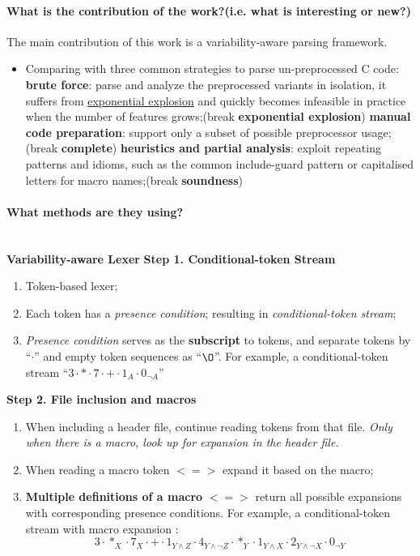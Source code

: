 \documentclass[12pt]{article}
\begin{document}
\paragraph{What is the contribution of the work?(i.e. what is interesting or new?)}
The main contribution of this work is a variability-aware parsing framework. 
\begin{itemize}
	\item  Comparing with three common strategies to parse un-preprocessed C code:
		\subitem \textbf{brute force}: parse and analyze the preprocessed variants in isolation, it suffers from \underline{exponential explosion} and quickly becomes infeasible in practice when the number of features grows;(break \textbf{exponential explosion})
		\subitem \textbf{manual code preparation}: support only a subset of possible preprocessor usage;(break \textbf{complete})
		\subitem \textbf{heuristics and partial analysis}: exploit repeating patterns and idioms, such as the common include-guard pattern or capitalised letters for macro names;(break \textbf{soundness}) 
\end{itemize}

\paragraph{What methods are they using?}\mbox{}\\

\textbf{Variability-aware Lexer}\newline
\textbf{Step 1. Conditional-token Stream}
\begin{enumerate}
	\item Token-based lexer;
	\item Each token has a \textit{presence condition}; resulting in \textit{conditional-token stream};
	\item \textit{Presence condition} serves as the \textbf{subscript} to tokens, and separate tokens by ``$\cdot $'' and empty token sequences as ``$\O $''. For example, a conditional-token stream ``$3\cdot * \cdot 7 \cdot + \cdot 1_{A} \cdot 0_{\neg A}$''
\end{enumerate}
\textbf{Step 2. File inclusion and macros}
\begin{enumerate}
	\item When including a header file, continue reading tokens from that file. \textit{Only when there is a macro, look up for expansion in the header file.}
	\item When reading a macro token $<=>$ expand it based on the macro;
	\item \textbf{Multiple definitions of a macro} $<=>$ return all possible expansions with corresponding presence conditions. For example, a conditional-token stream with macro expansion :
	$$3\cdot *_{X} \cdot 7_{X} \cdot + \cdot 1_{Y\wedge Z}  \cdot 4_{Y\wedge \neg Z} \cdot *_{Y} \cdot 1_{Y\wedge X} \cdot 2_{Y\wedge \neg X} \cdot 0 _{\neg Y}$$
\end{enumerate}
\end{document}
